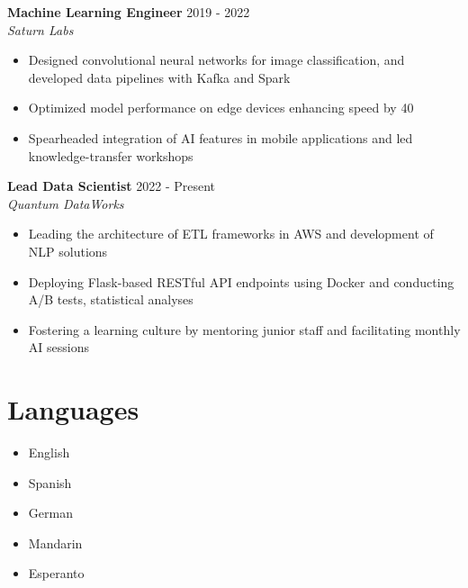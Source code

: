 \documentclass[a4paper,10pt]{article}
\begin{document}
\textbf{ Machine Learning Engineer } \hfill 2019 - 2022 \\
\textit{ Saturn Labs } \\
\vspace{-0.5cm}

\begin{itemize}[leftmargin=*, noitemsep, topsep=0pt]

    \item Designed convolutional neural networks for image classification, and developed data pipelines with Kafka and Spark

    \item Optimized model performance on edge devices enhancing speed by 40%

    \item Spearheaded integration of AI features in mobile applications and led knowledge-transfer workshops

\end{itemize}

\vspace{0.5cm}

\textbf{ Lead Data Scientist } \hfill 2022 - Present \\
\textit{ Quantum DataWorks } \\
\vspace{-0.5cm}

\begin{itemize}[leftmargin=*, noitemsep, topsep=0pt]

    \item Leading the architecture of ETL frameworks in AWS and development of NLP solutions

    \item Deploying Flask-based RESTful API endpoints using Docker and conducting A/B tests, statistical analyses

    \item Fostering a learning culture by mentoring junior staff and facilitating monthly AI sessions

\end{itemize}

\vspace{0.5cm}


\section*{Languages}

\begin{itemize}[leftmargin=*, noitemsep, topsep=0pt]

    \item English

    \item Spanish

    \item German

    \item Mandarin

    \item Esperanto

\end{itemize}
\end{document}
